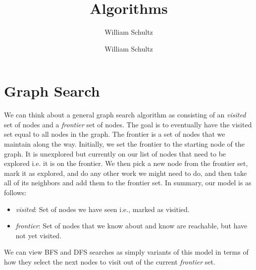 \documentclass[10pt,a4paper]{article}
\author{William Schultz}
\begin{document}
\title{Algorithms}
\author{William Schultz}
\maketitle

\newcommand{\concept}[1]{\textcolor{blue}{\textit{\textbf{#1}}}}

\section{Graph Search}

We can think about a general graph search algorithm as consisting of an \textit{visited} set of nodes and a \textit{frontier} set of nodes. The goal is to eventually have the visited set equal to all nodes in the graph. The frontier is a set of nodes that we maintain along the way. Initially, we set the frontier to the starting node of the graph. It is unexplored but currently on our list of nodes that need to be explored i.e. it is on the frontier. We then pick a new node from the frontier set, mark it as explored, and do any other work we might need to do, and then take all of its neighbors and add them to the frontier set. In summary, our model is as follows:

\begin{itemize}
    \item \textit{visited}: Set of nodes we have seen i.e., marked as visitied.
    \item \textit{frontier}: Set of nodes that we know about and know are reachable, but have not yet visited.
\end{itemize}
We can view BFS and DFS searches as simply variants of this model in terms of how they select the next nodes to visit out of the current \textit{frontier} set. 
\end{document}
